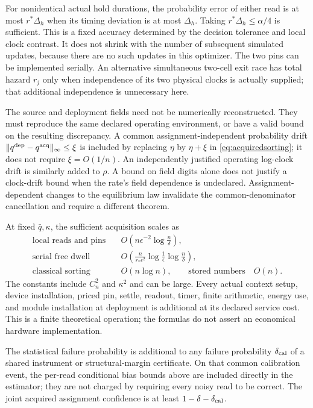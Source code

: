 For nonidentical actual hold durations, the probability error of either
read is at most $r^*\Delta_h$ when its timing deviation is at most
$\Delta_h$.  Taking $r^*\Delta_h\le\alpha/4$ is sufficient.
This is a fixed accuracy determined by the decision tolerance and local
clock contrast.  It does not shrink with the number of subsequent
simulated updates, because there are no such updates in this optimizer.
The two pins can be implemented serially.  An alternative simultaneous
two-cell exit race has total hazard $r_j$ only when independence of its
two physical clocks is actually supplied; that additional independence
is unnecessary here.

The source and deployment fields need not be numerically reconstructed.
They must reproduce the same declared operating environment, or have a
valid bound on the resulting discrepancy.  A common assignment-independent
probability drift $\|q^{\rm dep}-q^{\rm acq}\|_\infty\le\xi$ is included
by replacing $\eta$ by $\eta+\xi$ in
\eqref{eq:acquiredsorting}; it does not require $\xi=O(1/n)$.
An independently justified operating log-clock drift is similarly added
to $\rho$.  A bound on field digits alone does not justify a clock-drift
bound when the rate's field dependence is undeclared.  Assignment-dependent
changes to the equilibrium law invalidate the common-denominator
cancellation and require a different theorem.

At fixed $\bar q,\kappa$, the sufficient acquisition scales as
\begin{align*}
 \text{local reads and pins}\quad&
 O\!\left(n\epsilon^{-2}\log\frac n\delta\right),\\
 \text{serial free dwell}\quad&
 O\!\left(\frac n{r_*\epsilon^2}
     \log\frac1\epsilon\log\frac n\delta\right),\\
 \text{classical sorting}\quad& O(n\log n),
 \qquad \text{stored numbers}\quad O(n).
\end{align*}
The constants include $C_n^2$ and $\kappa^2$ and can be large.
Every actual context setup, device installation, priced pin, settle,
readout, timer, finite arithmetic, energy use, and module installation at
deployment is additional at its declared service cost.  This is a
finite theoretical operation; the formulas do not assert an economical
hardware implementation.

The statistical failure probability is additional to any failure
probability $\delta_{\rm cal}$ of a shared instrument or structural-margin
certificate.  On that common calibration event, the per-read conditional
bias bounds above are included directly in the estimator; they are not
charged by requiring every noisy read to be correct.  The joint acquired
assignment confidence is at least $1-\delta-\delta_{\rm cal}$.

